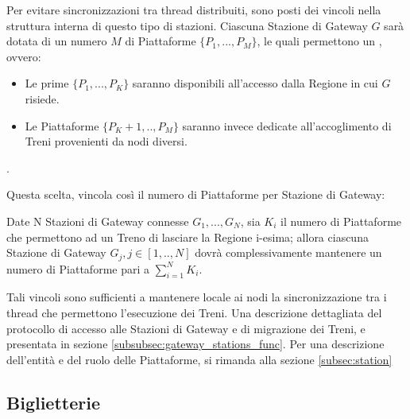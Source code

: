 	Per evitare sincronizzazioni tra thread distribuiti, sono posti dei vincoli nella struttura interna di questo tipo di stazioni. Ciascuna Stazione di Gateway $G$ sarà dotata di un numero $M$ di Piattaforme $\{P_1,...,P_M\}$, le quali permettono un , ovvero:
		
		\begin{itemize}
			\item Le prime $\{P_1,...,P_K\}$ saranno disponibili all'accesso dalla Regione in cui $G$ risiede.
			\item Le Piattaforme $\{P_K+1,..,P_M\}$ saranno invece dedicate all'accoglimento di Treni provenienti da nodi diversi.
		\end{itemize}.
	
	Questa scelta, vincola così il numero di Piattaforme per Stazione di Gateway: 
	
	\begin{consequence}
	Date N Stazioni di Gateway connesse $G_1,...,G_N$, sia $K_i$ il numero di Piattaforme che permettono ad un Treno di lasciare la Regione i-esima; allora ciascuna Stazione di Gateway $G_j, j\in[1,..,N]$ dovrà complessivamente mantenere un numero di Piattaforme pari a $\sum_{i = 1}^{N}{K_i}$.
	\end{consequence}
	
	 Tali vincoli sono sufficienti a mantenere locale ai nodi la sincronizzazione tra i thread che permettono l'esecuzione dei Treni. Una descrizione dettagliata del protocollo di accesso alle Stazioni di Gateway e di migrazione dei Treni, e presentata in sezione \ref{subsubsec:gateway_stations_func}.
	Per una descrizione dell'entità e del ruolo delle Piattaforme, si rimanda alla sezione \ref{subsec:station}


	\subsection{Biglietterie}\label{subsec:ticket_offices}
	
